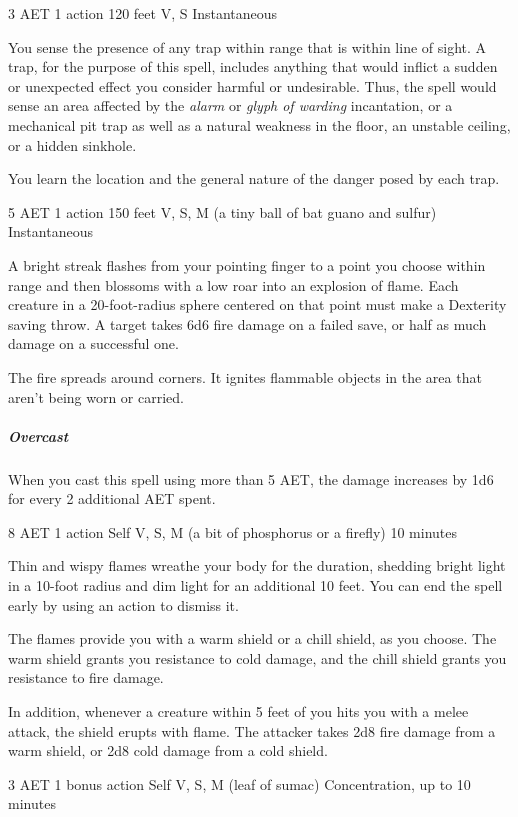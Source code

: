 {3 AET}
{1 action}
{120 feet}
{V, S}
{Instantaneous}

You sense the presence of any trap within range that is within line of sight. A trap, for the purpose of this spell, includes anything that would inflict a sudden or unexpected effect you consider harmful or undesirable. Thus, the spell would sense an area affected by the \textit{alarm} or \textit{glyph of warding} incantation, or a mechanical pit trap as well as a natural weakness in the floor, an unstable ceiling, or a hidden sinkhole.

You learn the location and the general nature of the danger posed by each trap.


{5 AET}
{1 action}
{150 feet}
{V, S, M (a tiny ball of bat guano and sulfur)}
{Instantaneous}

A bright streak flashes from your pointing finger to a point you choose within range and then blossoms with a low roar into an explosion of flame. Each creature in a 20-foot-radius sphere centered on that point must make a Dexterity saving throw. A target takes 6d6 fire damage on a failed save, or half as much damage on a successful one.

The fire spreads around corners. It ignites flammable objects in the area that aren't being worn or carried.

\subparagraph*{Overcast} When you cast this spell using more than 5 AET, the damage increases by 1d6 for every 2 additional AET spent.


{8 AET}
{1 action}
{Self}
{V, S, M (a bit of phosphorus or a firefly)}
{10 minutes}

Thin and wispy flames wreathe your body for the duration, shedding bright light in a 10-foot radius and dim light for an additional 10 feet. You can end the spell early by using an action to dismiss it.

The flames provide you with a warm shield or a chill shield, as you choose. The warm shield grants you resistance to cold damage, and the chill shield grants you resistance to fire damage.

In addition, whenever a creature within 5 feet of you hits you with a melee attack, the shield erupts with flame. The attacker takes 2d8 fire damage from a warm shield, or 2d8 cold damage from a cold shield.


{3 AET}
{1 bonus action}
{Self}
{V, S, M (leaf of sumac)}
{Concentration, up to 10 minutes}

